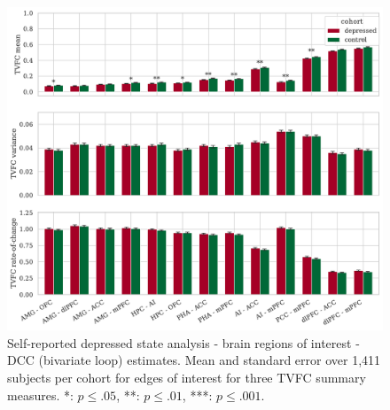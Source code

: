 \begin{figure}[h]
    \centering
    \includegraphics[width=\textwidth]{fig/ukbiobank/TVFC_predictions_summaries/self_reported_depression_state/cohort_comparison/ROI/correlation_all_TVFC_summary_measures_DCC_bivariate_loop_edges_of_interest}
    \caption{
        Self-reported depressed state analysis - brain regions of interest - DCC (bivariate loop) estimates.
        Mean and standard error over 1,411 subjects per cohort for edges of interest for three TVFC summary measures.
        *: $p \leq .05$, **: $p \leq .01$, ***: $p \leq .001$.
    }\label{fig:ukb-results-srds-roi-cohort-comparison-edges-of-interest-dcc-bl}
\end{figure}


